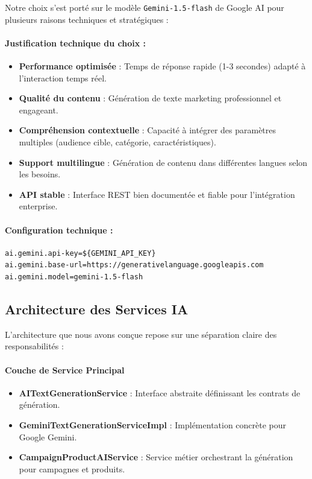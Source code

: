 Notre choix s'est porté sur le modèle \texttt{Gemini-1.5-flash} de Google AI pour plusieurs raisons techniques et stratégiques :

\paragraph{Justification technique du choix :}
\begin{itemize}[label=\textbullet]
    \item \textbf{Performance optimisée} : Temps de réponse rapide (1-3 secondes) adapté à l'interaction temps réel.
    \item \textbf{Qualité du contenu} : Génération de texte marketing professionnel et engageant.
    \item \textbf{Compréhension contextuelle} : Capacité à intégrer des paramètres multiples (audience cible, catégorie, caractéristiques).
    \item \textbf{Support multilingue} : Génération de contenu dans différentes langues selon les besoins.
    \item \textbf{API stable} : Interface REST bien documentée et fiable pour l'intégration enterprise.
\end{itemize}

\paragraph{Configuration technique :}
\begin{verbatim}
ai.gemini.api-key=${GEMINI_API_KEY}
ai.gemini.base-url=https://generativelanguage.googleapis.com
ai.gemini.model=gemini-1.5-flash
\end{verbatim}

\subsection{Architecture des Services IA}

L'architecture que nous avons conçue repose sur une séparation claire des responsabilités :

\paragraph{Couche de Service Principal}
\begin{itemize}[label=\textbullet]
    \item \textbf{AITextGenerationService} : Interface abstraite définissant les contrats de génération.
    \item \textbf{GeminiTextGenerationServiceImpl} : Implémentation concrète pour Google Gemini.
    \item \textbf{CampaignProductAIService} : Service métier orchestrant la génération pour campagnes et produits.
\end{itemize}

